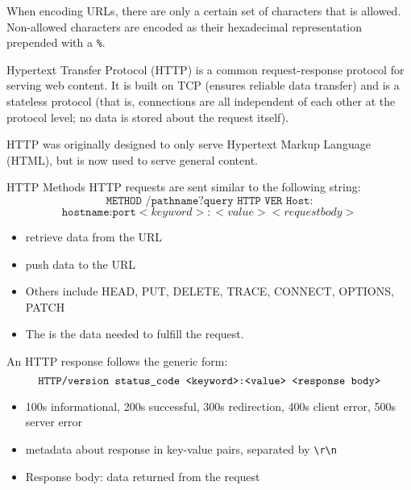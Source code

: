 When encoding URLs, there are only a certain set of characters that is allowed. Non-allowed characters are encoded as their hexadecimal representation prepended with a \texttt{\%}.

\begin{dfnbox}{Hypertext Transfer Protocol (HTTP)}{}
     is a common request-response protocol for serving web content. It is built on TCP (ensures reliable data transfer) and is a stateless protocol (that is, connections are all independent of each other at the protocol level; no data is stored about the request itself).
\end{dfnbox}

HTTP was originally designed to only serve Hypertext Markup Language (HTML), but is now used to serve general content.

\begin{dfnbox}{HTTP Methods}{}
    HTTP requests are sent similar to the following string:
    \[ \texttt{METHOD /pathname?query HTTP VER Host:} \] \[ \texttt{hostname:port} <keyword>:<value> <request body> \]
    \begin{itemize}[noitemsep]
        \item {} retrieve data from the URL
        \item {} push data to the URL
        \item Others include HEAD, PUT, DELETE, TRACE, CONNECT, OPTIONS, PATCH
        \item The  is the data needed to fulfill the request.
    \end{itemize}
    An HTTP response follows the generic form:
    \[ \texttt{HTTP/version status\textunderscore code <keyword>:<value> <response body>} \]
    \begin{itemize}[noitemsep]
        \item {} 100s informational, 200s successful, 300s redirection, 400s client error, 500s server error
        \item {} metadata about response in key-value pairs, separated by \texttt{\textbackslash r\textbackslash n}
        \item Response body: data returned from the request
    \end{itemize}
\end{dfnbox}


